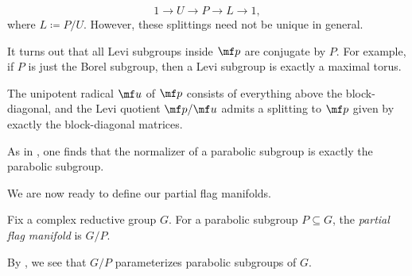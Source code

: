 \documentclass[../notes.tex]{subfiles}
\begin{document}
\[1\to U\to P\to L\to1,\]
where $L\coloneqq P/U$. However, these splittings need not be unique in general.
\begin{remark}
	It turns out that all Levi subgroups inside $\mf p$ are conjugate by $P$. For example, if $P$ is just the Borel subgroup, then a Levi subgroup is exactly a maximal torus.
\end{remark}
\begin{example}
	The unipotent radical $\mf u$ of $\mf p$ consists of everything above the block-diagonal, and the Levi quotient $\mf p/\mf u$ admits a splitting to $\mf p$ given by exactly the block-diagonal matrices.
\end{example}
\begin{remark} \label{rem:parabolic-is-own-normalizer}
	As in , one finds that the normalizer of a parabolic subgroup is exactly the parabolic subgroup.
\end{remark}
We are now ready to define our partial flag manifolds.
\begin{definition}
	Fix a complex reductive group $G$. For a parabolic subgroup $P\subseteq G$, the \textit{partial flag manifold} is $G/P$.
\end{definition}
\begin{remark}
	By , we see that $G/P$ parameterizes parabolic subgroups of $G$.
\end{remark}
\end{document}
